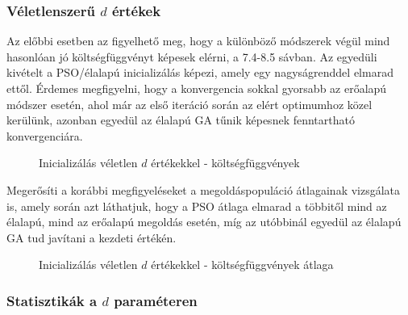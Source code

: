 \subsubsection{Véletlenszerű $d$ értékek}

Az előbbi esetben az figyelhető meg, hogy a különböző módszerek végül mind hasonlóan jó költségfüggvényt képesek elérni, a 7.4-8.5 sávban. Az egyedüli kivételt a PSO/élalapú inicializálás képezi, amely egy nagyságrenddel elmarad ettől. Érdemes megfigyelni, hogy a konvergencia sokkal gyorsabb az erőalapú módszer esetén, ahol már az első iteráció során az elért optimumhoz közel kerülünk, azonban egyedül az élalapú GA tűnik képesnek fenntartható konvergenciára.

\begin{figure}[H]
	\centering
	\hspace{5pt}
	\hspace{5pt}
	\caption{Inicializálás véletlen $d$ értékekkel - költségfüggvények}
\end{figure}

Megerősíti a korábbi megfigyeléseket a megoldáspopuláció átlagainak vizsgálata is, amely során azt láthatjuk, hogy a PSO átlaga elmarad a többitől mind az élalapú, mind az erőalapú megoldás esetén, míg az utóbbinál egyedül az élalapú GA tud javítani a kezdeti értékén.

\begin{figure}[H]
	\centering
	\hspace{5pt}
	\hspace{5pt}
	\caption{Inicializálás véletlen $d$ értékekkel - költségfüggvények átlaga}
\end{figure}

\subsubsection{Statisztikák a $d$ paraméteren}

